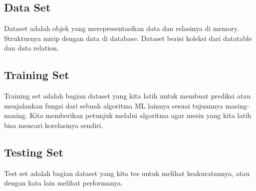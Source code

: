 \subsection{Data Set}
\hfill\break
Dataset adalah objek yang merepresentasikan data dan relasinya di memory. Strukturnya mirip dengan data di database. Dataset berisi koleksi dari datatable dan data relation.
\subsection{Training Set}
\hfill\break
Training set adalah bagian dataset yang kita latih untuk membuat prediksi atau menjalankan fungsi dari sebuah algoritma ML lainnya sesuai tujuannya masing-masing. Kita memberikan petunjuk melalui algoritma agar mesin yang kita latih bisa mencari korelasinya sendiri. 
\subsection{Testing Set}
\hfill\break
Test set adalah bagian dataset yang kita tes untuk melihat keakuratannya, atau dengan kata lain melihat performanya.


